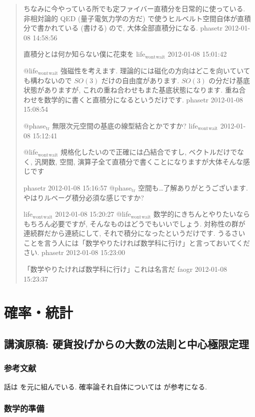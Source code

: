 \documentclass[openany, a4paper, oneside]{jsbook}
\begin{document}
\begin{quote}
ちなみに今やっている所でも定ファイバー直積分を日常的に使っている.
非相対論的 QED (量子電気力学の方だ) で使うヒルベルト空間自体が直積分で書かれている (書ける) ので, 大体全部直積分になる.
phasetr 2012-01-08 14:58:56

直積分とは何か知らない僕に花束を
life$_{\text{wont}}$$_{\text{wait}}$ 2012-01-08 15:01:42

@life$_{\text{wont}}$$_{\text{wait}}$ 強磁性を考えます.
理論的には磁化の方向はどこを向いていても構わないので $SO (3)$ だけの自由度があります.
$SO (3)$ の分だけ基底状態がありますが, これの重ね合わせもまた基底状態になります.
重ね合わせを数学的に書くと直積分になるというだけです.
phasetr 2012-01-08 15:08:54

@phase$_{\text{tr}}$ 無限次元空間の基底の線型結合とかですか?
life$_{\text{wont}}$$_{\text{wait}}$ 2012-01-08 15:12:41

@life$_{\text{wont}}$$_{\text{wait}}$ 規格化したいので正確には凸結合ですし,
ベクトルだけでなく, 汎関数, 空間, 演算子全て直積分で書くことになりますが大体そんな感じです

phasetr 2012-01-08 15:16:57
@phase$_{\text{tr}}$ 空間も…了解ありがとうございます. やはりルベーグ積分必須な感じですか?

life$_{\text{wont}}$$_{\text{wait}}$ 2012-01-08 15:20:27
@life$_{\text{wont}}$$_{\text{wait}}$ 数学的にきちんとやりたいならもちろん必要ですが, そんなものはどうでもいいでしょう.
対称性の群が連続群だから連続にして, それで積分になったというだけです.
うるさいことを言う人には「数学やりたければ数学科に行け」と言っておいてください.
phasetr 2012-01-08 15:23:00

「数学やりたければ数学科に行け」これは名言だ
faogr 2012-01-08 15:23:37
\end{quote}
\part{確率・統計}

\chapter{講演原稿: 硬貨投げからの大数の法則と中心極限定理}

\section{参考文献}

話は \cite{MarkKac1} を元に組んでいる.
確率論それ自体については \cite{TadahisaFunaki1} が参考になる.
\section{数学的準備}
\end{document}
